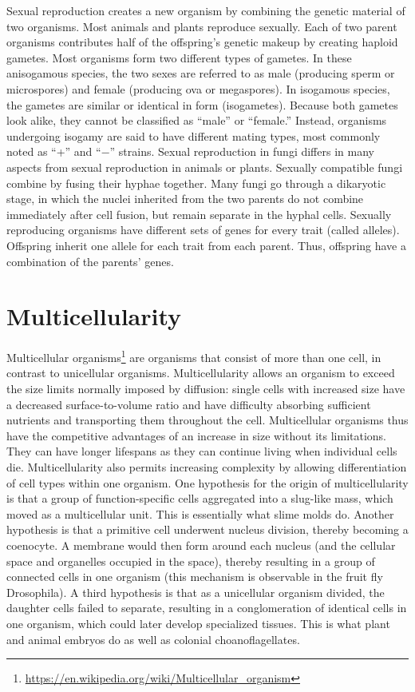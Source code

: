 \documentclass[]{book}
\let\rmarkdownfootnote\footnote%
\def\footnote{\protect\rmarkdownfootnote}
\renewcommand{\href}[2]{#2\footnote{\url{#1}}}
\theoremstyle{definition}
\theoremstyle{definition}
\theoremstyle{definition}
\theoremstyle{remark}
\begin{document}
\begin{enumerate}
Sexual reproduction creates a new organism by combining the genetic
material of two organisms. Most animals and plants reproduce sexually.
Each of two parent organisms contributes half of the offspring's genetic
makeup by creating haploid gametes. Most organisms form two different
types of gametes. In these anisogamous species, the two sexes are
referred to as male (producing sperm or microspores) and female
(producing ova or megaspores). In isogamous species, the gametes are
similar or identical in form (isogametes). Because both gametes look
alike, they cannot be classified as ``male'' or ``female.'' Instead,
organisms undergoing isogamy are said to have different mating types,
most commonly noted as ``+'' and ``−'' strains. Sexual reproduction in
fungi differs in many aspects from sexual reproduction in animals or
plants. Sexually compatible fungi combine by fusing their hyphae
together. Many fungi go through a dikaryotic stage, in which the nuclei
inherited from the two parents do not combine immediately after cell
fusion, but remain separate in the hyphal cells. Sexually reproducing
organisms have different sets of genes for every trait (called alleles).
Offspring inherit one allele for each trait from each parent. Thus,
offspring have a combination of the parents' genes.

\section{Multicellularity}\label{multicellularity}

\href{https://en.wikipedia.org/wiki/Multicellular_organism}{Multicellular
organisms} are organisms that consist of more than one cell, in contrast
to unicellular organisms. Multicellularity allows an organism to exceed
the size limits normally imposed by diffusion: single cells with
increased size have a decreased surface-to-volume ratio and have
difficulty absorbing sufficient nutrients and transporting them
throughout the cell. Multicellular organisms thus have the competitive
advantages of an increase in size without its limitations. They can have
longer lifespans as they can continue living when individual cells die.
Multicellularity also permits increasing complexity by allowing
differentiation of cell types within one organism. One hypothesis for
the origin of multicellularity is that a group of function-specific
cells aggregated into a slug-like mass, which moved as a multicellular
unit. This is essentially what slime molds do. Another hypothesis is
that a primitive cell underwent nucleus division, thereby becoming a
coenocyte. A membrane would then form around each nucleus (and the
cellular space and organelles occupied in the space), thereby resulting
in a group of connected cells in one organism (this mechanism is
observable in the fruit fly Drosophila). A third hypothesis is that as a
unicellular organism divided, the daughter cells failed to separate,
resulting in a conglomeration of identical cells in one organism, which
could later develop specialized tissues. This is what plant and animal
embryos do as well as colonial choanoflagellates.


\end{enumerate}
\end{document}
